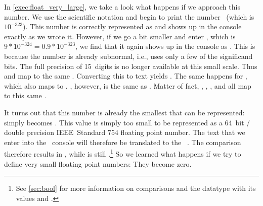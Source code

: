 In \cref{exec:float_very_large}, we take a look what happens if we approach this number.
We use the scientific notation and begin to print the number~ (which is~$10^{-323}$).
This number is correctly represented as  and shows up in the console exactly as we wrote it.
However, if we go a bit smaller and enter , which is~$9*10^{-324}=0.9*10^{-323}$, we find that it again shows up in the console as .
This is because the number is already subnormal, i.e., uses only a few of the significand bits.
The full precision of 15~digits is no longer available at this small scale.
Thus  and  map to the same .
Converting this  to text yields .
The same happens for , which also maps to .
, however, is the same as .
Matter of fact, , , , and  all map to this same .

It turns out that this number is already the smallest  that can be represented:
 simply becomes .
This value is simply too small to be represented as a 64~bit / double precision IEEE~Standard 754 floating point number.
The text  that we enter into the \python\ console will therefore be translated to the ~.
The comparison \pythonIdx{==} therefore results in , while  is still .\footnote{%
See \cref{sec:bool} for more information on comparisons and the  datatype with its values  and .%
}
So we learned what happens if we try to define very small floating point numbers:
They become zero.

%

